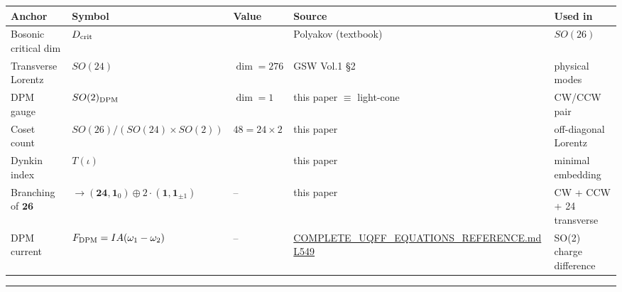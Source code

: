 \documentclass[
]{article}
\newcounter{none} %
\begin{document}
{\def\LTcaptype{none} %
\begin{longtable}[]{@{}
  >{\raggedright\arraybackslash}p{}
  >{\raggedright\arraybackslash}p{}
  >{\raggedleft\arraybackslash}p{}
  >{\raggedright\arraybackslash}p{}
  >{\raggedright\arraybackslash}p{}@{}}
\toprule\noalign{}
\begin{minipage}[b]{\linewidth}\raggedright
Anchor
\end{minipage} & \begin{minipage}[b]{\linewidth}\raggedright
Symbol
\end{minipage} & \begin{minipage}[b]{\linewidth}\raggedleft
Value
\end{minipage} & \begin{minipage}[b]{\linewidth}\raggedright
Source
\end{minipage} & \begin{minipage}[b]{\linewidth}\raggedright
Used in
\end{minipage} \\
\midrule\noalign{}
\endhead
\bottomrule\noalign{}
\endlastfoot
Bosonic critical dim & \(D_{\rm crit}\) & 26 & Polyakov (textbook) &
\(SO(26)\) \\
Transverse Lorentz & \(SO(24)\) & \(\dim = 276\) & GSW Vol.1 §2 &
physical modes \\
DPM gauge & \(SO(2)_{\rm DPM}\) & \(\dim = 1\) & this paper \(\equiv\)
light-cone & CW/CCW pair \\
Coset count & \(SO(26)/(SO(24)\times SO(2))\) & \(48 = 24\times 2\) &
this paper & off-diagonal Lorentz \\
Dynkin index & \(T(\iota)\) & 1 & this paper & minimal embedding \\
Branching of \(\mathbf{26}\) &
\(\to (\mathbf{24},\mathbf{1}_0)\oplus 2\cdot(\mathbf{1},\mathbf{1}_{\pm1})\)
& -- & this paper & CW + CCW + 24 transverse \\
DPM current & \(F_{\rm DPM} = I A(\omega_1-\omega_2)\) & -- &
\href{COMPLETE_UQFF_EQUATIONS_REFERENCE.md\#L549}{COMPLETE\_UQFF\_EQUATIONS\_REFERENCE.md
L549} & SO(2) charge difference \\
\end{longtable}
}

\begin{center}\rule{0.5\linewidth}{0.5pt}\end{center}
\end{document}
